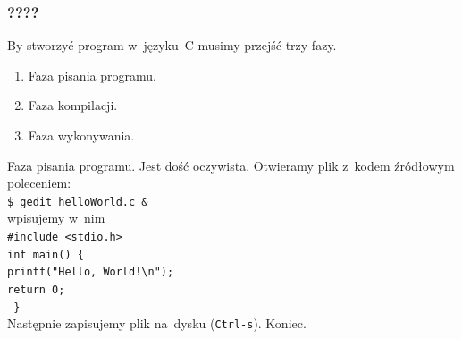 \documentclass[10pt,t]{beamer}
\begin{document}
\begin{frame}
  \frametitle{????}


  By stworzyć program w~języku~C musimy przejść trzy fazy.

  \begin{enumerate}

  \item Faza pisania programu.

  \item Faza kompilacji.

  \item Faza wykonywania.

  \end{enumerate}



  \alert{Faza pisania programu.} Jest dość oczywista. Otwieramy plik
  z~kodem źródłowym poleceniem: \\
  \texttt{\$ gedit helloWorld.c \&} \\
  wpisujemy w~nim \\
  \texttt{\#include <stdio.h>} \\
  \texttt{int main() \{ } \\
  \hphantom{aaaa} \texttt{printf("Hello, World!\textbackslash n");} \\
  \hphantom{aaaa} \texttt{return 0;} \\
  \texttt{ \} } \\
  Następnie zapisujemy plik na~dysku (\texttt{Ctrl-s}). Koniec.

















\end{frame}
\end{document}
